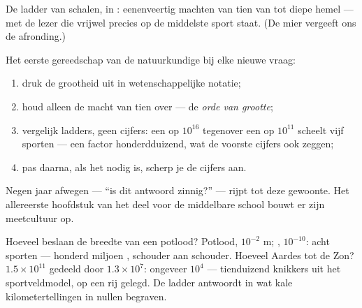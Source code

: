 \begin{omfigure}

{\small De ladder van schalen, in : eenenveertig machten
van tien van  tot diepe hemel --- met de lezer die vrijwel
precies op de middelste sport staat. (De mier vergeeft ons de
afronding.)}
\end{omfigure}

\begin{method}\label{met:g9:atoms-to-galaxies:oom}
Het eerste gereedschap van de natuurkundige bij elke nieuwe vraag:
\begin{enumerate}
  \item druk de grootheid uit in wetenschappelijke notatie;
  \item houd alleen de macht van tien over --- de \emph{orde van
        grootte};
  \item vergelijk ladders, geen cijfers: een  op $10^{16}$
         tegenover een  op $10^{11}$
        scheelt vijf sporten --- een factor honderdduizend, wat de
        voorste cijfers ook zeggen;
  \item pas daarna, als het nodig is, scherp je de cijfers aan.
\end{enumerate}
Negen jaar afwegen --- ``is dit antwoord zinnig?'' --- rijpt tot deze
gewoonte. Het allereerste hoofdstuk van het deel voor de middelbare
school bouwt er zijn meetcultuur op.
\end{method}

\begin{example}\label{ex:g9:atoms-to-galaxies:arithmetic}
Hoeveel  beslaan de breedte van een potlood? Potlood,
$10^{-2}$ \unit{m}; , $10^{-10}$: acht sporten ---
honderd miljoen , schouder aan schouder. Hoeveel Aardes
tot de Zon? $1.5 \times 10^{11}$ gedeeld door $1.3 \times 10^{7}$:
ongeveer $10^{4}$ --- tienduizend knikkers uit het sportveldmodel, op
een rij gelegd. De ladder antwoordt in  wat kale
kilometertellingen in nullen begraven.
\end{example}

